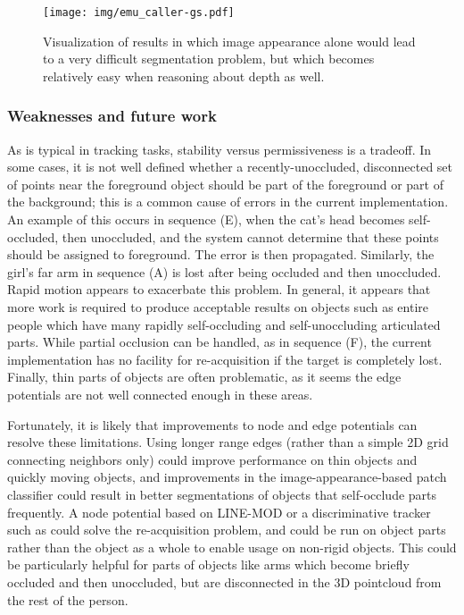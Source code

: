 \documentclass[journal]{IEEEtran}
\begin{document}
\begin{figure*}
  \centering
  \texttt{[image: img/emu\_caller-gs.pdf]}
  \caption{Visualization of results in which image appearance alone would lead to a very difficult segmentation problem, but which becomes relatively easy when reasoning about depth as well.}
  \label{fig:emu}
\end{figure*}

\subsubsection{Weaknesses and future work}

As is typical in tracking tasks, stability versus permissiveness is a tradeoff.  In some cases, it is not well defined whether a recently-unoccluded, disconnected set of points near the foreground object should be part of the foreground or part of the background; this is a common cause of errors in the current implementation.  An example of this occurs in sequence (E), when the cat's head becomes self-occluded, then unoccluded, and the system cannot determine that these points should be assigned to foreground.  The error is then propagated.  Similarly, the girl's far arm in sequence (A) is lost after being occluded and then unoccluded.  Rapid motion appears to exacerbate this problem.  In general, it appears that more work is required to produce acceptable results on objects such as entire people which have many rapidly self-occluding and self-unoccluding articulated parts.  While partial occlusion can be handled, as in sequence (F), the current implementation has no facility for re-acquisition if the target is completely lost.  Finally, thin parts of objects are often problematic, as it seems the edge potentials are not well connected enough in these areas.

Fortunately, it is likely that improvements to node and edge potentials can resolve these limitations.  Using longer range edges (rather than a simple 2D grid connecting neighbors only) could improve performance on thin objects and quickly moving objects, and improvements in the image-appearance-based patch classifier could result in better segmentations of objects that self-occlude parts frequently.  A node potential based on LINE-MOD or a discriminative tracker such as \cite{kalal2010a} could solve the re-acquisition problem, and could be run on object parts rather than the object as a whole to enable usage on non-rigid objects.  This could be particularly helpful for parts of objects like arms which become briefly occluded and then unoccluded, but are disconnected in the 3D pointcloud from the rest of the person.
\end{document}
